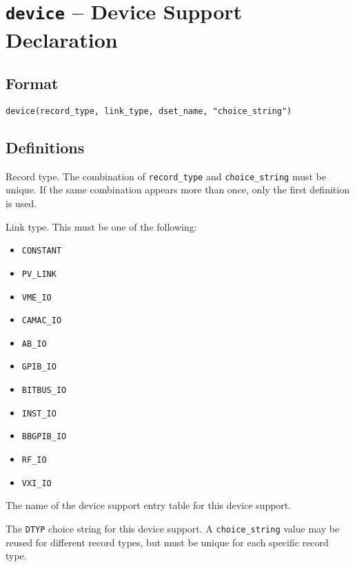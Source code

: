 \section{\texttt{device} -- Device Support Declaration}

\subsection{Format}

\begin{verbatim}
device(record_type, link_type, dset_name, "choice_string")
\end{verbatim}

\subsection{Definitions}

\begin{description}
\item [record\_type] Record type.
The combination of \verb|record_type| and \verb|choice_string| must be unique.
If the same combination appears more than once, only the first definition is used.

\item [link\_type] Link type. This must be one of the following:

\begin{itemize}
\item \verb|CONSTANT|
\item \verb|PV_LINK|
\item \verb|VME_IO|
\item \verb|CAMAC_IO|
\item \verb|AB_IO|
\item \verb|GPIB_IO|
\item \verb|BITBUS_IO|
\item \verb|INST_IO|
\item \verb|BBGPIB_IO|
\item \verb|RF_IO|
\item \verb|VXI_IO|
\end{itemize}

\item [dset\_name] The name of the device support entry table for this device support.

\item [choice\_string] The \verb|DTYP| choice string for this device support.
A \verb|choice_string| value may be reused for different record types, but must be unique for each specific record type.
\end{description}

